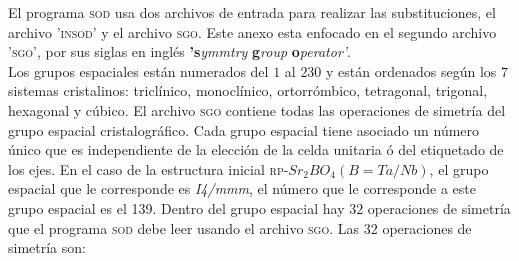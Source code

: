 \label{anexoA}

El programa \textsc{sod} usa dos archivos de entrada para realizar las substituciones, el archivo \textsc{'insod'} y el archivo \textsc{sgo}. Este anexo esta enfocado en el segundo archivo \textsc{'sgo'}, por sus siglas en inglés \textbf{'s}\textit{ymmtry} \textbf{g}\textit{roup} \textbf{o}\textit{perator'}.\\

Los grupos espaciales están numerados del $1$ al $230$ y están ordenados según los $7$ sistemas cristalinos: triclínico, monoclínico, ortorrómbico, tetragonal, trigonal, hexagonal y cúbico. El archivo \textsc{sgo} contiene todas las operaciones de simetría del grupo espacial cristalográfico. Cada grupo espacial tiene asociado un número único que es independiente de la elección de la celda unitaria ó del etiquetado de los ejes\cite{urlcsgdt}. En el caso de la estructura inicial \textsc{rp}-$Sr_{2}BO_{4}(B=Ta/Nb)$, el grupo espacial que le corresponde es \textit{I4/mmm}, el número que le corresponde a este grupo espacial es el 139. Dentro del grupo espacial hay $32$ operaciones de simetría que el programa \textsc{sod} debe leer usando el archivo \textsc{sgo}. Las $32$ operaciones de simetría son:

